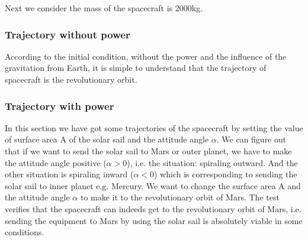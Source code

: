 \documentclass[../Paper.tex]{subfiles}
\begin{document}
Next we consider the mass of the spacecraft is 2000kg.

\subsubsection{Trajectory without power}

According to the initial condition, without the power and the influence of the gravitation from Earth, it is simple to understand that the trajectory of spacecraft is the revolutionary orbit.

\subsubsection{Trajectory with power}

In this section we have got some trajectories of the spacecraft by setting the value of surface area A of the solar sail and the attitude angle $\alpha$. We can figure out that if we want to send the solar sail to Mars or outer planet, we have to make the attitude angle positive ($\alpha > 0$),  i.e. the situation: spiraling outward. And the other situation is spiraling inward ($\alpha < 0$) which is corresponding to sending the solar sail to inner planet e.g. Mercury. We want to change the surface area A and the attitude angle $\alpha$ to make it to the revolutionary orbit of Mars. The test verifies that the spacecraft can indeeds get to the revolutionary orbit of Mars, i.e. sending the equipment to Mars by using the solar sail is absolutely viable in some conditions.


\end{document}
